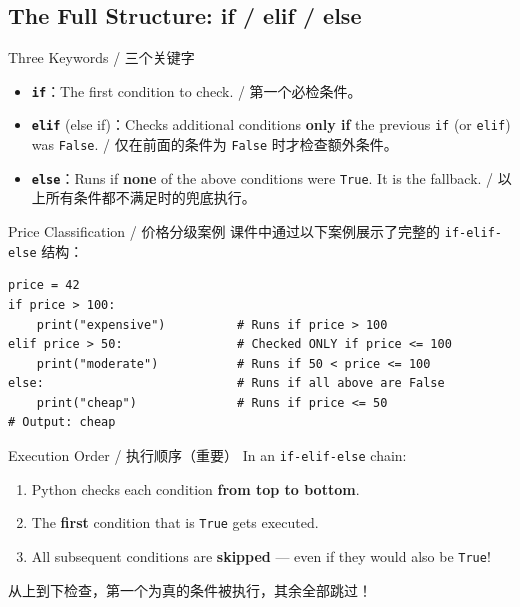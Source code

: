 \documentclass[11pt,a4paper]{article}
\begin{document}
\subsection{The Full Structure: if / elif / else}

\begin{concept}{Three Keywords / 三个关键字}
    \begin{itemize}[itemsep=0.5em]
        \item \textbf{\texttt{if}}：The first condition to check. / 第一个必检条件。
        \item \textbf{\texttt{elif}} (else if)：Checks additional conditions \textbf{only if} the previous \texttt{if} (or \texttt{elif}) was \texttt{False}. / 仅在前面的条件为 \texttt{False} 时才检查额外条件。
        \item \textbf{\texttt{else}}：Runs if \textbf{none} of the above conditions were \texttt{True}. It is the fallback. / 以上所有条件都不满足时的兜底执行。
    \end{itemize}
\end{concept}

\begin{examplebox}{Price Classification / 价格分级案例}
    课件中通过以下案例展示了完整的 \texttt{if-elif-else} 结构：
\begin{lstlisting}
price = 42
if price > 100:
    print("expensive")          # Runs if price > 100
elif price > 50:                # Checked ONLY if price <= 100
    print("moderate")           # Runs if 50 < price <= 100
else:                           # Runs if all above are False
    print("cheap")              # Runs if price <= 50
# Output: cheap
\end{lstlisting}
\end{examplebox}

\begin{warning}{Execution Order / 执行顺序（重要）}
    In an \texttt{if-elif-else} chain:
    \begin{enumerate}[itemsep=0.3em]
        \item Python checks each condition \textbf{from top to bottom}.
        \item The \textbf{first} condition that is \texttt{True} gets executed.
        \item All subsequent conditions are \textbf{skipped} — even if they would also be \texttt{True}!
    \end{enumerate}
    从上到下检查，第一个为真的条件被执行，其余全部跳过！
\end{warning}
\end{document}
